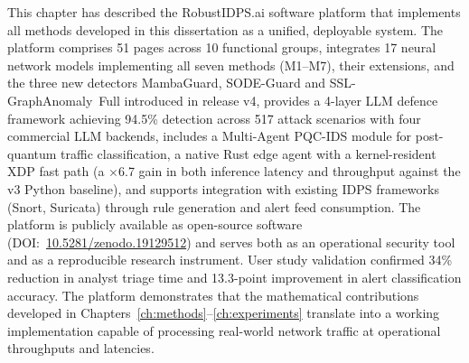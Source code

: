 This chapter has described the \textsf{RobustIDPS.ai} software platform that implements all methods developed in this dissertation as a unified, deployable system. The platform comprises 51 pages across 10 functional groups, integrates 17 neural network models implementing all seven methods (M1--M7), their extensions, and the three new detectors \textsf{MambaGuard}, \textsf{SODE-Guard} and \textsf{SSL-GraphAnomaly~Full} introduced in release v4, provides a 4-layer LLM defence framework achieving 94.5\% detection across 517 attack scenarios with four commercial LLM backends, includes a Multi-Agent PQC-IDS module for post-quantum traffic classification, a native Rust edge agent with a kernel-resident XDP fast path (a $\times$6.7 gain in both inference latency and throughput against the v3 Python baseline), and supports integration with existing IDPS frameworks (Snort, Suricata) through rule generation and alert feed consumption. The platform is publicly available as open-source software (DOI:~\url{10.5281/zenodo.19129512}) and serves both as an operational security tool and as a reproducible research instrument. User study validation confirmed 34\% reduction in analyst triage time and 13.3-point improvement in alert classification accuracy. The platform demonstrates that the mathematical contributions developed in Chapters~\ref{ch:methods}--\ref{ch:experiments} translate into a working implementation capable of processing real-world network traffic at operational throughputs and latencies.
